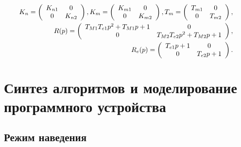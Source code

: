 \begin{equation}
\label{eq:p4:s3.10}
\begin{aligned}
K_n = \left( \begin{array}{c c}
K_{n1} & 0 \\
0 & K_{n2}
\end{array}\right),
K_m = \left( \begin{array}{c c}
K_{m1} & 0 \\
0 & K_{m2}
\end{array}\right), 
T_m = \left( \begin{array}{c c}
T_{m1} & 0 \\
0 & T_{m2}
\end{array}\right), \\
R(p) = \left( \begin{array}{c c}
T_{M1} T_{e1} p^2 + T_{M1} p +1 & 0 \\
0 & T_{M2} T_{e2} p^2 + T_{M2} p +1
\end{array}\right), \\
R_e(p) = \left( \begin{array}{c c}
T_{e1} p + 1 & 0 \\
0 & T_{e2} p + 1
\end{array}\right).
\end{aligned}
\end{equation}

\begin{comment}
\subsection{Уравнения движения привода по азимуту} \label{subsec:ch4/sect3/sub1}

Линеаризованные уравнения движения азимутального привода совместно с объектом управления запишутся [29] [30] [31] [32] [33] [34]:

\subsection{Уравнения движения привода по углу места} \label{subsec:ch4/sect3/sub2}
\end{comment}

\section{Синтез алгоритмов и моделирование программного устройства} \label{ch:ch4/sect2+}

\subsection{Режим наведения} \label{subsec:ch4/sect2/sub1}

